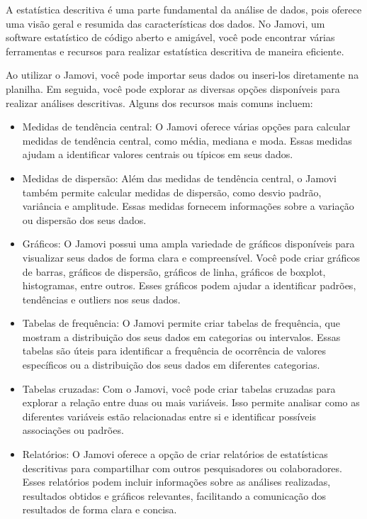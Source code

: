 A estatística descritiva é uma parte fundamental da análise de dados, pois oferece uma visão geral e resumida das características dos dados. No Jamovi, um software estatístico de código aberto e amigável, você pode encontrar várias ferramentas e recursos para realizar estatística descritiva de maneira eficiente.

Ao utilizar o Jamovi, você pode importar seus dados ou inseri-los diretamente na planilha. Em seguida, você pode explorar as diversas opções disponíveis para realizar análises descritivas. Alguns dos recursos mais comuns incluem:

\begin{itemize}
    \item Medidas de tendência central: O Jamovi oferece várias opções para calcular medidas de tendência central, como média, mediana e moda. Essas medidas ajudam a identificar valores centrais ou típicos em seus dados.
    \item Medidas de dispersão: Além das medidas de tendência central, o Jamovi também permite calcular medidas de dispersão, como desvio padrão, variância e amplitude. Essas medidas fornecem informações sobre a variação ou dispersão dos seus dados.
    \item Gráficos: O Jamovi possui uma ampla variedade de gráficos disponíveis para visualizar seus dados de forma clara e compreensível. Você pode criar gráficos de barras, gráficos de dispersão, gráficos de linha, gráficos de boxplot, histogramas, entre outros. Esses gráficos podem ajudar a identificar padrões, tendências e outliers nos seus dados.
    \item Tabelas de frequência: O Jamovi permite criar tabelas de frequência, que mostram a distribuição dos seus dados em categorias ou intervalos. Essas tabelas são úteis para identificar a frequência de ocorrência de valores específicos ou a distribuição dos seus dados em diferentes categorias.
    \item Tabelas cruzadas: Com o Jamovi, você pode criar tabelas cruzadas para explorar a relação entre duas ou mais variáveis. Isso permite analisar como as diferentes variáveis estão relacionadas entre si e identificar possíveis associações ou padrões.
    \item Relatórios: O Jamovi oferece a opção de criar relatórios de estatísticas descritivas para compartilhar com outros pesquisadores ou colaboradores. Esses relatórios podem incluir informações sobre as análises realizadas, resultados obtidos e gráficos relevantes, facilitando a comunicação dos resultados de forma clara e concisa.
\end{itemize}

